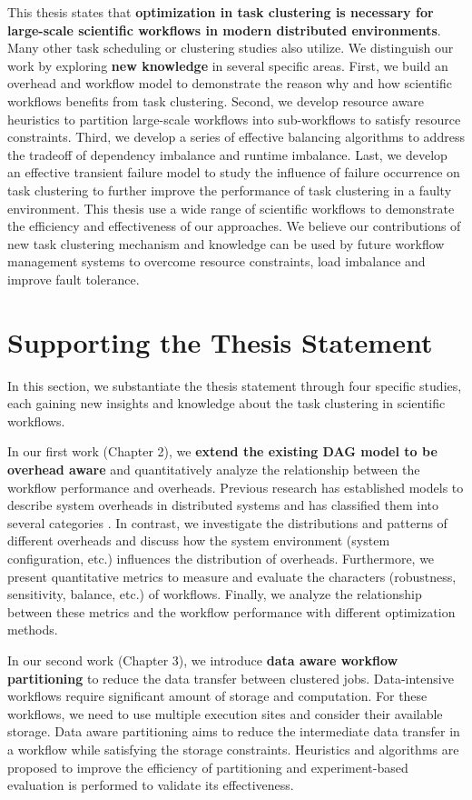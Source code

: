 This thesis states that \textbf{optimization in task clustering is necessary for large-scale scientific workflows in modern distributed environments}.  Many other task scheduling or clustering studies also utilize. We distinguish our work by exploring \textbf{new knowledge} in several specific areas. First, we build an overhead and workflow model to demonstrate the reason why and how scientific workflows benefits from task clustering. Second, we develop resource aware heuristics to partition large-scale workflows into sub-workflows to satisfy resource constraints. Third, we develop a series of effective balancing algorithms to address the tradeoff of dependency imbalance and runtime imbalance. Last, we develop an effective transient failure model to study the influence of failure occurrence on task clustering to further improve the performance of task clustering in a faulty environment. This thesis use a wide range of scientific workflows to demonstrate the efficiency and effectiveness of our approaches. We believe our contributions of new task clustering mechanism and knowledge can be used by future workflow management systems to overcome resource constraints, load imbalance and improve fault tolerance. 

\section{Supporting the Thesis Statement}

In this section, we substantiate the thesis statement through four specific studies, each gaining new insights and knowledge about the task clustering in scientific workflows. 

In our first work \cite{Chen2011} (Chapter 2), we \textbf{extend the existing DAG model to be overhead aware} and quantitatively analyze the relationship between the workflow performance and overheads. Previous research has established models to describe system overheads in distributed systems and has classified them into several categories \cite{Prodan2007, Prodan2008}. In contrast, we investigate the distributions and patterns of different overheads and discuss how the system environment (system configuration, etc.) influences the distribution of overheads. Furthermore, we present quantitative metrics to measure and evaluate the characters (robustness, sensitivity, balance, etc.) of workflows. Finally, we analyze the relationship between these metrics and the workflow performance with different optimization methods. 

In our second work \cite{Integration2012, Chen2011a} (Chapter 3), we introduce \textbf{data aware workflow partitioning} to reduce the data transfer between clustered jobs. Data-intensive workflows require significant amount of storage and computation. For these workflows, we need to use multiple execution sites and consider their available storage. Data aware partitioning aims to reduce the intermediate data transfer in a workflow while satisfying the storage constraints. Heuristics and algorithms are proposed to improve the efficiency of partitioning and experiment-based evaluation is performed to validate its effectiveness.  


